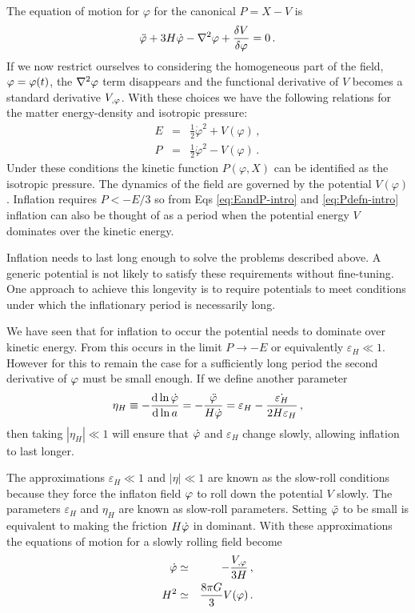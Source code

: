 The equation of motion for $\varphi$ for the canonical $P=X-V$ is
% 
\begin{equation}
 \label{eq:phieom1-intro}
 \ddot{\varphi} + 3H\dot{\varphi} -\nabla^2 \varphi + \frac{\delta V}{\delta \varphi} = 0\,.
\end{equation}
% 
If we now restrict ourselves to considering the homogeneous part of the field,
$\varphi=\varphi(t)$, the $\nabla^2\varphi$ term disappears and the functional derivative
of $V$ becomes a standard derivative $V_{,\varphi}$. 
With these choices we have the following relations for the matter
energy-density and isotropic pressure:
% 
\begin{eqnarray}
\label{eq:EandP-intro}
 E &=& \frac{1}{2}\dot{\varphi}^2 + V(\varphi) \,,\\
\label{eq:Pdefn-intro}
 P &=& \frac{1}{2}\dot{\varphi}^2 - V(\varphi) \,.
\end{eqnarray}
% 
Under these conditions the kinetic function $P(\varphi, X)$ can be identified as
the isotropic pressure. The dynamics of the field are governed by the potential
$V(\varphi)$. Inflation requires $P<-E/3$ so from Eqs \eqref{eq:EandP-intro} and
\eqref{eq:Pdefn-intro} inflation
can also be thought of as a period when the potential energy $V$ dominates over
the kinetic energy. 


Inflation needs to last long enough to solve the problems described above. A generic
potential is not likely to satisfy these requirements without fine-tuning. One
approach to achieve this longevity is to require potentials to meet
conditions under which the inflationary period is necessarily long. 

We have seen that for
inflation to occur the potential needs to dominate over kinetic energy. From
 this occurs in the limit $P\rightarrow -E$ or equivalently
$\varepsilon_H \ll 1$. However for this to remain the case for a sufficiently long
period the second derivative of $\varphi$ must be small enough. If we define
another parameter 
% 
\begin{equation}
 \label{eq:etaHdefn-intro}
 \eta_H \equiv -\frac{\mathrm{d} \ln \dot{\varphi}}{\mathrm{d} \ln a} =
-\frac{\ddot{\varphi}}{H\dot{\varphi}}
 =\varepsilon_H -\frac{\dot{\varepsilon_H}}{2H\varepsilon_H}\,,
\end{equation}
% 
then taking $|\eta_H|\ll 1$ will ensure that $\dot{\varphi}$ and $\varepsilon_H$
change slowly, allowing inflation to last longer.

The approximations $\varepsilon_H\ll 1$ and $|\eta|\ll 1$ are known as the
slow-roll conditions because they force the inflaton field $\varphi$ to roll down
the potential $V$ slowly. The parameters $\varepsilon_H$ and $\eta_H$ are known as
slow-roll parameters. Setting $\ddot{\varphi}$ to be small is equivalent to
making the friction $H\dot{\varphi}$ in  dominant. With
these approximations the
equations of motion for a slowly rolling field become
% 
\begin{eqnarray}
 \dot{\varphi} &\simeq& - \frac{V_{,\varphi}}{3H}\,, \\
 H^2 &\simeq& \frac{8\pi G}{3}V(\varphi)\,.
\end{eqnarray}




